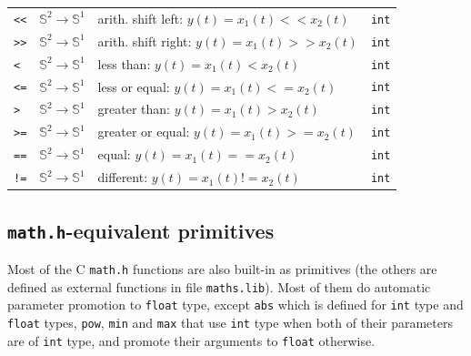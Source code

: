 \begin{tabular}{|l|l|l|l|}
\texttt{<}\texttt{<} & $\mathbb{S}^{2}\rightarrow\mathbb{S}^{1}$ & arith. shift left: $y(t)=x_{1}(t) << x_{2}(t)$   	& \texttt{int} \\
\texttt{>}\texttt{>} & $\mathbb{S}^{2}\rightarrow\mathbb{S}^{1}$ & arith. shift right: $y(t)=x_{1}(t) >> x_{2}(t)$  	& \texttt{int}  \\


\texttt{<} & $\mathbb{S}^{2}\rightarrow\mathbb{S}^{1}$ & less than: $y(t)=x_{1}(t) < x_{2}(t)$  			& \texttt{int}  \\
\texttt{<=} & $\mathbb{S}^{2}\rightarrow\mathbb{S}^{1}$ & less or equal: $y(t)=x_{1}(t) <= x_{2}(t)$  		& \texttt{int} \\
\texttt{>} & $\mathbb{S}^{2}\rightarrow\mathbb{S}^{1}$ & greater than: $y(t)=x_{1}(t) > x_{2}(t)$   	   	& \texttt{int} \\
\texttt{>=} & $\mathbb{S}^{2}\rightarrow\mathbb{S}^{1}$ & greater or equal: $y(t)=x_{1}(t) >= x_{2}(t)$   	& \texttt{int} \\
\texttt{==} & $\mathbb{S}^{2}\rightarrow\mathbb{S}^{1}$ & equal: $y(t)=x_{1}(t) == x_{2}(t)$ 			& \texttt{int}  \\
\texttt{!=} & $\mathbb{S}^{2}\rightarrow\mathbb{S}^{1}$ & different: $y(t)=x_{1}(t) != x_{2}(t)$  			& \texttt{int} \\

\hline

\end{tabular}

\bigskip

\subsection{\texttt{math.h}-equivalent primitives}

Most of the C \texttt{math.h} functions are also built-in as primitives (the others are defined as external functions in file \texttt{maths.lib}). 
Most of them do automatic parameter promotion to \texttt{float} type, except \lstinline'abs' which is defined for \texttt{int} type and \texttt{float} types, \lstinline'pow', \lstinline'min' and \lstinline'max' that use \texttt{int} type when both of their parameters are of \texttt{int} type, and promote their arguments to \texttt{float} otherwise.

